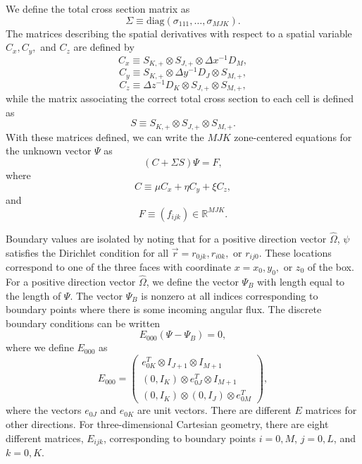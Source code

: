 We define the total cross section matrix as
\begin{equation}
	\Sigma \equiv \text{diag}(\sigma_{111}, \dots, \sigma_{MJK}).
\end{equation}
The matrices describing the spatial derivatives with respect to a spatial variable $C_{x}, C_{y},$ and $C_{z}$ are defined by
\begin{equation}
	C_{x} \equiv S_{K,+} \otimes S_{J,+} \otimes \Delta x^{-1} D_{M},
\end{equation}
\begin{equation}
	C_{y} \equiv S_{K,+} \otimes \Delta y^{-1} D_{J} \otimes S_{M,+},
\end{equation}
\begin{equation}
	C_{z} \equiv \Delta z^{-1} D_{K} \otimes S_{J,+} \otimes S_{M,+},
\end{equation}
while the matrix associating the correct total cross section to each cell is defined as
\begin{equation}
	S \equiv S_{K,+} \otimes S_{J,+} \otimes S_{M,+}.
\end{equation}
With these matrices defined, we can write the $MJK$ zone-centered equations for the unknown vector $\Psi$ as
\begin{equation}
	(C + \Sigma S) \Psi = F,
	\label{eq:Disc}
\end{equation}
where
\begin{equation}
	C \equiv \mu C_{x} + \eta C_{y} + \xi C_{z},
\end{equation}
and 
\begin{equation}
F \equiv (f_{ijk}) \in \mathbb{R}^{MJK}.
\end{equation}

Boundary values are isolated by noting that for a positive direction vector $\hat{\Omega}$, $\psi$ satisfies the Dirichlet condition for all $\vec{r} = r_{0jk}, r_{i0k},$ or $r_{ij0}$. These locations correspond to one of the three faces with coordinate $x = x_{0}, y_{0},$ or $z_{0}$ of the box. For a positive direction vector $\hat{\Omega}$, we define the vector $\Psi_{B}$ with length equal to the length of $\Psi$. The vector $\Psi_{B}$ is nonzero at all indices corresponding to boundary points where there is some incoming angular flux. The discrete boundary conditions can be written
\begin{equation}
	E_{000}(\Psi - \Psi_{B}) = 0,
\end{equation}
where we define $E_{000}$ as
\begin{equation}
	E_{000} = \begin{pmatrix}
				e_{0K}^{T} \otimes I_{J+1} \otimes I_{M+1} \\
				(0,I_{K}) \otimes e_{0J}^{T} \otimes I_{M+1} \\
				(0,I_{K}) \otimes (0,I_{J}) \otimes e_{0M}^{T}
			\end{pmatrix},
\end{equation}
where the vectors $e_{0J}$ and $e_{0K}$ are unit vectors. There are different $E$ matrices for other directions. For three-dimensional Cartesian geometry, there are eight different matrices, $E_{ijk}$, corresponding to boundary points $i=0,M$, $j=0,L$, and $k = 0,K$.

